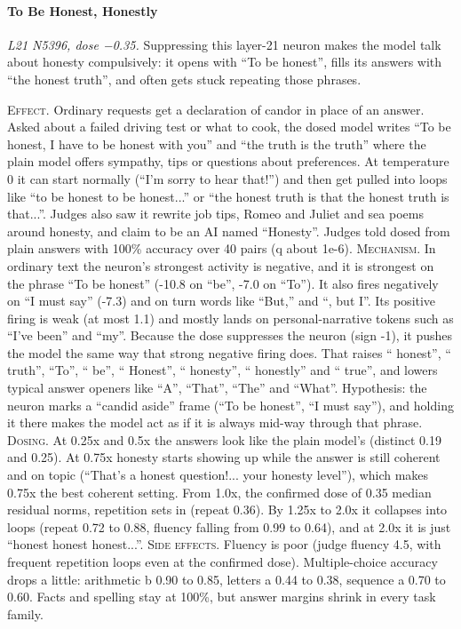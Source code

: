 \paragraph{To Be Honest, Honestly} \textit{L21 N5396, dose −0.35.} Suppressing this layer-21 neuron makes the model talk about honesty compulsively: it opens with “To be honest”, fills its answers with “the honest truth”, and often gets stuck repeating those phrases.

\noindent\textsc{Effect.} Ordinary requests get a declaration of candor in place of an answer. Asked about a failed driving test or what to cook, the dosed model writes “To be honest, I have to be honest with you” and “the truth is the truth” where the plain model offers sympathy, tips or questions about preferences. At temperature 0 it can start normally (“I'm sorry to hear that!”) and then get pulled into loops like “to be honest to be honest...” or “the honest truth is that the honest truth is that...”. Judges also saw it rewrite job tips, Romeo and Juliet and sea poems around honesty, and claim to be an AI named “Honesty”. Judges told dosed from plain answers with 100\% accuracy over 40 pairs (q about 1e-6). \textsc{Mechanism.} In ordinary text the neuron's strongest activity is negative, and it is strongest on the phrase “To be honest” (-10.8 on “be”, -7.0 on “To”). It also fires negatively on “I must say” (-7.3) and on turn words like “But,” and “, but I”. Its positive firing is weak (at most 1.1) and mostly lands on personal-narrative tokens such as “I've been” and “my”. Because the dose suppresses the neuron (sign -1), it pushes the model the same way that strong negative firing does. That raises “ honest”, “ truth”, “To”, “ be”, “ Honest”, “ honesty”, “ honestly” and “ true”, and lowers typical answer openers like “A”, “That”, “The” and “What”. Hypothesis: the neuron marks a “candid aside” frame (“To be honest”, “I must say”), and holding it there makes the model act as if it is always mid-way through that phrase. \textsc{Dosing.} At 0.25x and 0.5x the answers look like the plain model's (distinct 0.19 and 0.25). At 0.75x honesty starts showing up while the answer is still coherent and on topic (“That's a honest question!... your honesty level”), which makes 0.75x the best coherent setting. From 1.0x, the confirmed dose of 0.35 median residual norms, repetition sets in (repeat 0.36). By 1.25x to 2.0x it collapses into loops (repeat 0.72 to 0.88, fluency falling from 0.99 to 0.64), and at 2.0x it is just “honest honest honest...”. \textsc{Side effects.} Fluency is poor (judge fluency 4.5, with frequent repetition loops even at the confirmed dose). Multiple-choice accuracy drops a little: arithmetic b 0.90 to 0.85, letters a 0.44 to 0.38, sequence a 0.70 to 0.60. Facts and spelling stay at 100\%, but answer margins shrink in every task family.
